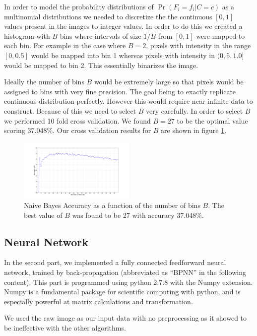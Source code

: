 \documentclass[10pt,twocolumn]{article}
\begin{document}
In order to model the probability distributions of $\Pr(F_i = f_i | C = c)$ as a multinomial distributions we needed to discretize the the continuous $[0,1]$ values present in the images to integer values. In order to do this we created a histogram with $B$ bins where intervals of size $1/B$ from $[0,1]$ were mapped to each bin. For example in the case where $B = 2$, pixels with intensity in the range $[0,0.5]$ would be mapped into bin 1 whereas pixels with intensity in $(0,5,1.0]$ would be mapped to bin 2. This essentially binarizes the image.

Ideally the number of bins $B$ would be extremely large so that pixels would be assigned to bins with very fine precision. The goal being to exactly replicate continuous distribution perfectly. However this would require near infinite data to construct. Because of this we need to select $B$ very carefully. In order to select $B$ we performed 10 fold cross validation. We found $B=27$ to be the optimal value scoring 37.048\%. Our cross validation results for $B$ are shown in figure \ref{bins}.
\begin{figure}
\includegraphics[trim=150 40 150 50,clip=true,width=0.5\textwidth]{./figure_1.png}
\caption{Naive Bayes Accuracy as a function of the number of bins $B$. The best value of $B$ was found to be 27 with accuracy 37.048\%.}
\label{bins}
\end{figure}
\subsection{Neural Network}
In the second part, we implemented a fully connected feedforward neural network, trained by back-propagation (abbreviated as “BPNN” in the following content). This part is programmed using python 2.7.8 with the Numpy extension. Numpy is a fundamental package for scientific computing with python, and is especially powerful at matrix calculations and transformation\cite{numpy}.

We used the raw image as our input data with no preprocessing as it showed to be ineffective with the other algorithms.
\end{document}
